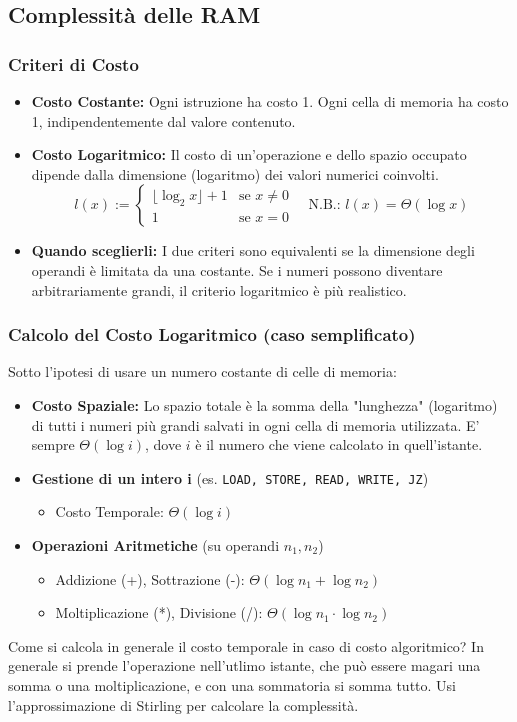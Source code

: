 \subsection{Complessità delle RAM}

\subsubsection{Criteri di Costo}
\begin{itemize}
    \item \textbf{Costo Costante:} Ogni istruzione ha costo 1. Ogni cella di memoria ha costo 1, indipendentemente dal valore contenuto.
    \item \textbf{Costo Logaritmico:} Il costo di un'operazione e dello spazio occupato dipende dalla dimensione (logaritmo) dei valori numerici coinvolti.
    $$
    l(x) := 
    \begin{cases}
        \lfloor \log_2 x \rfloor + 1 & \text{se } x \neq 0 \\
        1 & \text{se } x = 0
    \end{cases}
    \quad \text{N.B.: } l(x) = \Theta(\log x)
    $$
    \item \textbf{Quando sceglierli:} I due criteri sono equivalenti se la dimensione degli operandi è limitata da una costante. Se i numeri possono diventare arbitrariamente grandi, il criterio logaritmico è più realistico.
\end{itemize}

\subsubsection{Calcolo del Costo Logaritmico (caso semplificato)}
Sotto l'ipotesi di usare un numero costante di celle di memoria:
\begin{itemize}
    \item \textbf{Costo Spaziale:} Lo spazio totale è la somma della "lunghezza" (logaritmo) di tutti i numeri più grandi salvati in ogni cella di memoria utilizzata. E' sempre $\Theta(\log i)$, dove $i$ è il numero che viene calcolato in quell'istante.
    \item \textbf{Gestione di un intero i} (es. \texttt{LOAD, STORE, READ, WRITE, JZ})
    \begin{itemize}
        \item Costo Temporale: $\Theta(\log i)$
    \end{itemize}
    \item \textbf{Operazioni Aritmetiche} (su operandi $n_1, n_2$)
    \begin{itemize}
        \item Addizione (+), Sottrazione (-): $\Theta(\log n_1 + \log n_2)$
        \item Moltiplicazione (*), Divisione (/): $\Theta(\log n_1 \cdot \log n_2)$
    \end{itemize}
\end{itemize}

Come si calcola in generale il costo temporale in caso di costo algoritmico? In generale si prende l'operazione nell'utlimo istante, che può essere magari una somma o una moltiplicazione, e con una sommatoria si somma tutto. Usi l'approssimazione di Stirling per calcolare la complessità.
